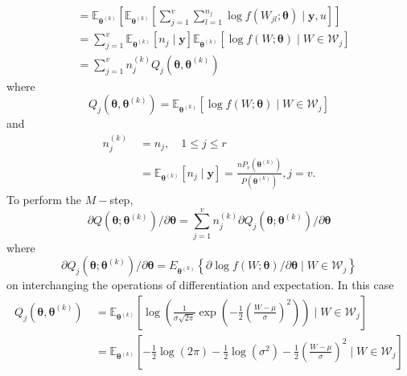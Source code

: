 \begin{exam}
\begin{align*}
         & = \mathbb{E}_{\bm{\theta}^{(k)}} \left[ \mathbb{E}_{\bm{\theta}^{(k)}} \left[ \sum_{j=1}^{v} \sum_{l=1}^{n_j} \log f \left( W_{jl} ; \bm{\theta} \right) \mid \bm{y} , u \right]\right]        \\
         & = \sum_{j=1}^{v} \mathbb{E}_{\bm{\theta}^{(k)}} \left[ n_j \mid \bm{y} \right] \mathbb{E}_{\bm{\theta}^{(k)}} \left[  \log f \left( W ; \bm{\theta} \right) \mid W \in \mathcal{W}_{j} \right] \\
         & = \sum_{j=1}^{v} n_{j}^{(k)} Q_j (\bm{\theta} , \bm{\theta}^{(k)})
    \end{align*}
    where
    \[
        Q_j (\bm{\theta} , \bm{\theta}^{(k)}) = \mathbb{E}_{\bm{\theta}^{(k)}} \left[ \log f (W;\bm{\theta}) \mid W \in \mathcal{W}_{j} \right]
    \]
    and
    \begin{align*}
        n_{j}^{(k)} \
         & = n_j, \quad 1 \leq j \leq r                                                                                                     \\
         & = \mathbb{E}_{\bm{\theta}^{(k)}} \left[ n_j \mid \bm{y} \right] = \frac{n P_{v}(\bm{\theta}^{(k)})}{P(\bm{\theta}^{(k)})}, j=v .
    \end{align*}
    To perform the $M-$step,
    \begin{equation*}
        \partial Q\left(\boldsymbol{\theta} ; \boldsymbol{\theta}^{(k)}\right) / \partial \boldsymbol{\theta}=\sum_{j=1}^{v} n_{j}^{(k)} \partial Q_{j}\left(\boldsymbol{\theta} ; \boldsymbol{\theta}^{(k)}\right) / \partial \boldsymbol{\theta}
    \end{equation*}
    where
    \begin{equation*}
        \partial Q_{j}\left(\boldsymbol{\theta} ; \boldsymbol{\theta}^{(k)}\right) / \partial \boldsymbol{\theta}=E_{\boldsymbol{\theta}^{(k)}}\left\{\partial \log f(W ; \boldsymbol{\theta}) / \partial \boldsymbol{\theta} \mid W \in \mathcal{W}_{j}\right\}
    \end{equation*}
    on interchanging the operations of differentiation and expectation. In this case
    \begin{align*}
        Q_j (\bm{\theta} , \bm{\theta}^{(k)}) \
         & = \mathbb{E}_{\bm{\theta}^{(k)}} \left[ \log \left( \frac{1}{\sigma \sqrt{2 \pi}} \exp \left( -\frac{1}{2} \left( \frac{W - \mu}{\sigma} \right)^2 \right) \right) \mid W \in \mathcal{W}_{j} \right]              \\
         & = \mathbb{E}_{\bm{\theta}^{(k)}} \left[ - \frac{1}{2} \log \left( 2 \pi \right) - \frac{1}{2} \log \left( \sigma^2 \right) -\frac{1}{2} \left( \frac{W - \mu}{\sigma} \right)^2 \mid W \in \mathcal{W}_{j} \right] \\

\end{align*}
\end{exam}
